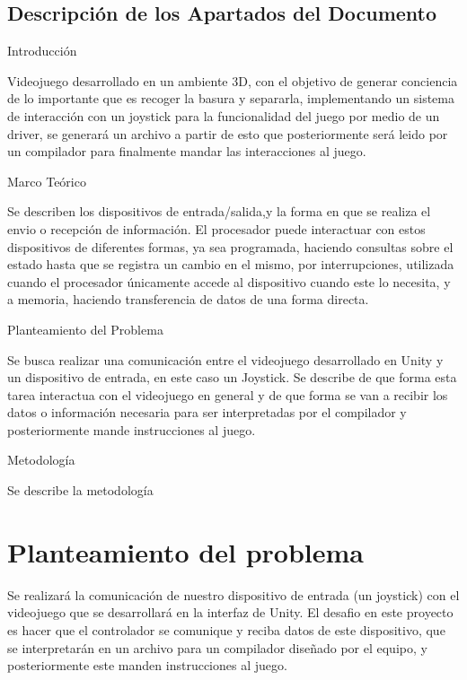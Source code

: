 \documentclass[preprint,12pt]{elsarticle}
\begin{document}
\subsection{Descripción de los Apartados del Documento}
Introducción\newline

\newline Videojuego desarrollado en un ambiente 3D, con el objetivo de generar conciencia de lo importante que es recoger la basura y separarla, implementando un sistema de interacción con un joystick para la funcionalidad del juego por medio de un driver, se generará un archivo a partir de esto que posteriormente será leido por un compilador para finalmente mandar las interacciones al juego.

Marco Teórico\newline

\newline Se describen los dispositivos de entrada/salida,y la forma en que se realiza el envio o recepción de información. El procesador puede interactuar con estos dispositivos de diferentes formas, ya sea programada, haciendo consultas sobre el estado hasta que se registra un cambio en el mismo, por interrupciones, utilizada cuando el procesador únicamente accede al dispositivo cuando este lo necesita, y a memoria, haciendo transferencia de datos de una forma directa.\newline

Planteamiento del Problema\newline

Se busca realizar una comunicación entre el videojuego desarrollado en Unity y un dispositivo de entrada, en este caso un Joystick. Se describe de que forma esta tarea interactua con el videojuego en general y de que forma se van a recibir los datos o información necesaria para ser interpretadas por el compilador y posteriormente mande instrucciones al juego. \newline

Metodología\newline

\newline Se describe la metodología 

\section{Planteamiento del problema}
\label{sec:planprob}
Se realizará la comunicación de nuestro dispositivo de entrada (un joystick) con el videojuego que se desarrollará en la interfaz de Unity. El desafio en este proyecto es hacer que el controlador se comunique y reciba datos de este dispositivo, que se interpretarán en un archivo para un compilador diseñado por el equipo, y posteriormente este manden instrucciones al juego.\newline
\end{document}
